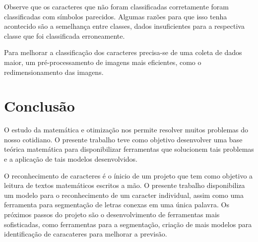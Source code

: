 \documentclass[
	12pt,				%
    oneside,			%
	a4paper,			%
	english,			%
	french,				%
	spanish,			%
	brazil,				%
	]{abntex2}
\begin{document}
        Observe que os caracteres que não foram classificadas corretamente foram classificadas com símbolos parecidos. Algumas razões para que isso tenha acontecido são a semelhança entre classes, dados insuficientes para a respectiva classe que foi classificada erroneamente.

        Para melhorar a classificação dos caracteres precisa-se de uma coleta de dados maior, um pré-processamento de imagens mais eficientes, como o redimensionamento das imagens.

\chapter*[Conclusão]{Conclusão}
    O estudo da matemática e otimização nos permite resolver muitos problemas do nosso cotidiano. O presente trabalho teve como objetivo desenvolver uma base teórica matemática para disponibilizar ferramentas que solucionem tais problemas e a aplicação de tais modelos desenvolvidos.

    O reconhecimento de caracteres é o ínicio de um projeto que tem como objetivo a leitura de textos matemáticos escritos a mão. O presente trabalho disponibiliza um modelo para o reconhecimento de um caracter individual, assim como uma ferramenta para segmentação de letras conexas em uma única palavra. Os próximos passos do projeto são o desenvolvimento de ferramentas mais sofisticadas, como ferramentas para a segmentação, criação de mais modelos para identificação de caracateres para melhorar a previsão.



\postextual


\nocite{ng,mitchell,wfan,zhang,burfa,tensorflow2015,bajmes}

%
%

\end{document}
